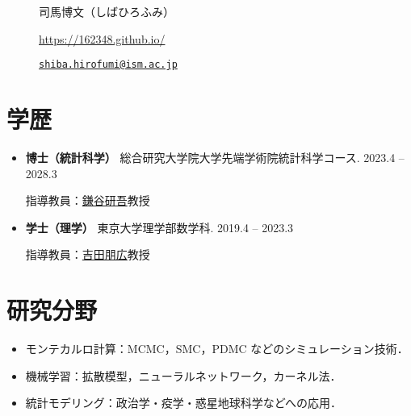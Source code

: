 \documentclass[
  11pt,
]{article}
\date{}
\renewcommand{\labelitemi}{\textcolor{minty}{\faCheckCircle}} %
\begin{document}
\begin{figure}

\begin{minipage}{0.50\linewidth}
\Huge 司馬博文（しばひろふみ）\end{minipage}%
%
\begin{minipage}{0.50\linewidth}

\color{minty}

\hfill {} \url{https://162348.github.io/}

\par

\hfill {}
\href{mailto:shiba.hirofumi@ism.ac.jp}{\nolinkurl{shiba.hirofumi@ism.ac.jp}}

\par

\end{minipage}%

\end{figure}%

\vspace{-1em}

\section{学歴}\label{ux5b66ux6b74}

\renewcommand{\labelitemi}{\textcolor{minty}{\faGraduationCap}}

\begin{itemize}
\item
  \textbf{博士（統計科学）} 総合研究大学院大学先端学術院統計科学コース.
  \hfill {2023.4 -- 2028.3}

  指導教員：\href{https://sites.google.com/view/kengokamatani/home}{鎌谷研吾}教授
\item
  \textbf{学士（理学）} 東京大学理学部数学科. \hfill {2019.4 -- 2023.3}

  指導教員：\href{https://www.ms.u-tokyo.ac.jp/~nakahiro/hp-naka-e}{吉田朋広}教授
\end{itemize}

\section{研究分野}\label{ux7814ux7a76ux5206ux91ce}

\renewcommand{\labelitemi}{\textcolor{minty}{\faCheck}}

\begin{itemize}
\item
  モンテカルロ計算：MCMC，SMC，PDMC などのシミュレーション技術．
\item
  機械学習：拡散模型，ニューラルネットワーク，カーネル法．
\item
  統計モデリング：政治学・疫学・惑星地球科学などへの応用．
\end{itemize}
\end{document}
